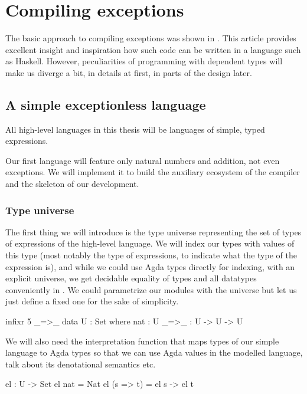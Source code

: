\chapter{Compiling exceptions}

The basic approach to compiling exceptions was shown in \cite{gmh:exceptions}.
This article provides excellent insight and inspiration how such code can be written
in a language such as Haskell.
However, peculiarities of programming with dependent types will make us
diverge a bit, in details at first, in parts of the design later.

\section{A simple exceptionless language}

All high-level languages in this thesis will be languages of simple, typed
expressions.

Our first language will feature only natural numbers and addition, not even
exceptions. We will implement it to build the auxiliary ecosystem of the
compiler and the skeleton of our development.

\subsection{Type universe}

The first thing we will introduce is the type universe representing the set of
types of expressions of the high-level language. We will index our types with
values of this type (most notably the type  of expressions, to
indicate what the type of the expression is), and while we could use Agda types
directly for indexing, with an explicit universe, we get decidable equality of
types and all datatypes conveniently in . We could parametrize our
modules with the universe but let us just define a fixed one for the sake of
simplicity.

\begin{code}
  infixr 5 _=>_
  data U : Set where
    nat : U
    _=>_ : U -> U -> U
\end{code}

\noindent We will also need the interpretation function  that maps
types of our simple language to Agda types so that we can use Agda values in
the modelled language, talk about its denotational semantics etc.

\begin{code}
  el : U -> Set
  el nat = Nat
  el (s => t) = el s -> el t
\end{code}

